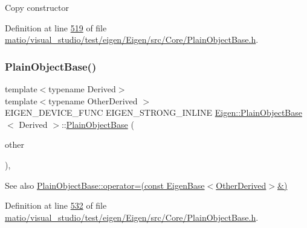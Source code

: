 Copy constructor 

Definition at line \hyperlink{matio_2visual__studio_2test_2eigen_2_eigen_2src_2_core_2_plain_object_base_8h_source_l00519}{519} of file \hyperlink{matio_2visual__studio_2test_2eigen_2_eigen_2src_2_core_2_plain_object_base_8h_source}{matio/visual\+\_\+studio/test/eigen/\+Eigen/src/\+Core/\+Plain\+Object\+Base.\+h}.

\mbox{\label{class_eigen_1_1_plain_object_base_a82cdb1b9d5c90c2002cb5086c03c29fa}} 
\subsubsection{\texorpdfstring{Plain\+Object\+Base()}{PlainObjectBase()}\hspace{0.1cm}{\footnotesize\ttfamily [5/6]}}
{\footnotesize\ttfamily template$<$typename Derived$>$ \\
template$<$typename Other\+Derived $>$ \\
E\+I\+G\+E\+N\+\_\+\+D\+E\+V\+I\+C\+E\+\_\+\+F\+U\+NC E\+I\+G\+E\+N\+\_\+\+S\+T\+R\+O\+N\+G\+\_\+\+I\+N\+L\+I\+NE \hyperlink{class_eigen_1_1_plain_object_base}{Eigen\+::\+Plain\+Object\+Base}$<$ Derived $>$\+::\hyperlink{class_eigen_1_1_plain_object_base}{Plain\+Object\+Base} (\begin{DoxyParamCaption}\item[{const \hyperlink{group___core___module_class_eigen_1_1_dense_base}{Dense\+Base}$<$ Other\+Derived $>$ \&}]{other }\end{DoxyParamCaption})\hspace{0.3cm}{\ttfamily [inline]}, {\ttfamily [protected]}}

\begin{DoxySeeAlso}{See also}
\hyperlink{class_eigen_1_1_plain_object_base_a6d280056e43429f043e8b25262ee6153}{Plain\+Object\+Base\+::operator=(const Eigen\+Base$<$\+Other\+Derived$>$\&)} 
\end{DoxySeeAlso}


Definition at line \hyperlink{matio_2visual__studio_2test_2eigen_2_eigen_2src_2_core_2_plain_object_base_8h_source_l00532}{532} of file \hyperlink{matio_2visual__studio_2test_2eigen_2_eigen_2src_2_core_2_plain_object_base_8h_source}{matio/visual\+\_\+studio/test/eigen/\+Eigen/src/\+Core/\+Plain\+Object\+Base.\+h}.

